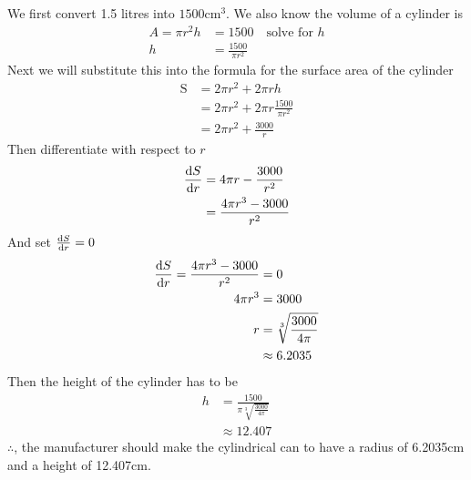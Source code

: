 \documentclass[working]{tuftebook}
\begin{document}
We first convert 1.5 litres into $1500 \text{cm}^3$. We also know the volume of a cylinder is 
\begin{align*}
    A=\pi r^2h&=1500\quad \text{solve for $h$}\\ 
    h&= \frac{1500}{\pi r^2}
\end{align*}
Next we will substitute this into the formula for the surface area of the cylinder 
\begin{align*}
    \text{S}&=2\pi r^2+2\pi rh\\ 
             &= 2\pi r^2+2\pi r \frac{1500}{\pi r^2}\\ 
             &=2\pi r^2+ \frac{3000}{r}
\end{align*}
Then differentiate with respect to $r$
\begin{align*}
    \dv{S}{r}&=4\pi r- \frac{3000}{r^2}\\ 
             &= \frac{4\pi r^3-3000}{r^2}
\end{align*}
And set $ \dv{S}{r}=0$
\begin{align*}
    \dv{S}{r}= \frac{4\pi r^3-3000}{r^2}&=0\\
    4\pi r^3&=3000\\ 
    r&= \sqrt[3]{ \frac{3000}{4\pi}}\\
     &\approx 6.2035
\end{align*}
Then the height of the cylinder has to be 
\begin{align*}
    h&= \frac{1500}{\pi\sqrt[3]{ \frac{3000}{4\pi}}}\\ 
     &\approx 12.407
\end{align*}
$\therefore$, the manufacturer should make the cylindrical can to have a radius of 6.2035cm and a height of 12.407cm. 
\end{document}
